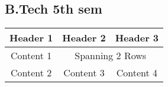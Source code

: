 \documentclass[a3paper]{article}
\begin{document}
\begin{center}

	\section*{B.Tech 5th sem}
	\label{sec:B.Tech 5th sem}

	




\begin{tabular}{|c|c|c|}
\hline
Header 1 & Header 2 & Header 3 \\
\hline
Content 1 & \multicolumn{2}{c|}{Spanning 2 Rows} \\
\hline
Content 2 & Content 3 & Content 4 \\
\hline
\end{tabular}



\end{center}
\end{document}
